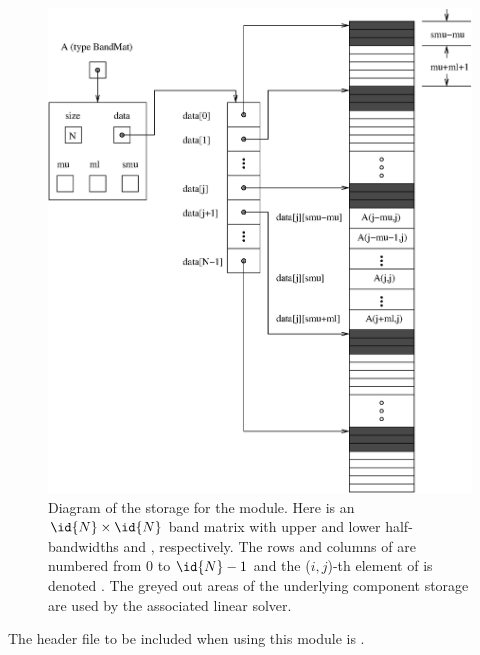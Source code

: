 \begin{figure}
\centerline{\includegraphics[width=4.5 in]{bandmat}}
\caption[Diagram of the storage for a {\sunmatband} object]
  {Diagram of the storage for the {\sunmatband} module. Here  is an
  $\id{N} \times \id{N}$ band matrix with upper and lower half-bandwidths 
  and , respectively. The rows and columns of  are
  numbered from $0$ to $\id{N}-1$ and the ($i,j$)-th element of  is
  denoted . The greyed out areas of the underlying
  component storage are used by the associated {\sunlinsolband}
  linear solver.}\label{f:sunbandmat}
\end{figure}

\noindent The header file to be included when using this module 
is . \\

